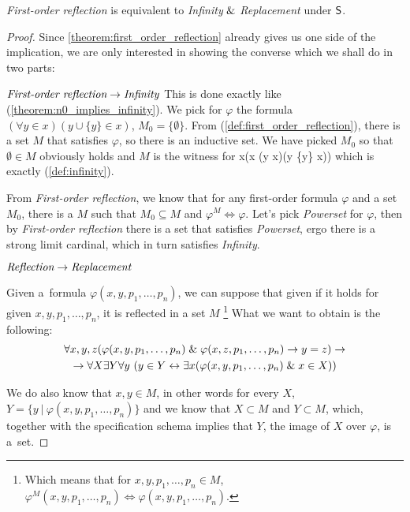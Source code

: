 \begin{theorem}\label{theorem:levy_equivalence_contemporary}
\emph{First-order reflection} is equivalent to \emph{Infinity} $ \mathrel{\&} $ \emph{Replacement} under $\sf{S}$.
\end{theorem}
\begin{proof}
Since \ref{theorem:first_order_reflection} already gives us one side of the implication, we are only interested in showing the converse which we shall do in two parts:

$\bold{\emph{First-order reflection} \rightarrow \emph{Infinity}}$
This is done exactly like (\ref{theorem:n0_implies_infinity}). We pick for $\varphi$ the formula $(\forall y \in x)(y \cup \{y\} \in x)$, $M_0 = \{\emptyset\}$. From (\ref{def:first_order_reflection}), there is a set $M$ that satisfies $\varphi$, so there is an inductive set. We have picked $M_0$ so that $\emptyset \in M$ obviously holds and $M$ is the witness for 
\beq
\exists x(\emptyset \in x \et (\forall y \in x)(y \cup \{y\} \in x))
\eeq
which is exactly (\ref{def:infinity}).

From \emph{First-order reflection}, we know that for any first-order formula $\varphi$ and a set $M_0$, there is a $M$ such that $M_0 \subseteq M$ and $\varphi^M \iff \varphi$. Let's pick \emph{Powerset} for $\varphi$, then by \emph{First-order reflection} there is a set that satisfies \emph{Powerset}, ergo there is a strong limit cardinal, which in turn satisfies \emph{Infinity}.
\

$\bold{\emph{Reflection} \rightarrow \emph{Replacement}}$

Given a~formula $\varphi(x, y, p_1, \ldots, p_n)$, we can suppose that given if it holds for given $x, y, p_1, \ldots, p_n$, it is reflected in a set $M$ \footnote{Which means that for $x, y, p_1, \ldots, p_n \in M$, $\varphi^M(x, y, p_1, \ldots, p_n) \iff \varphi(x, y, p_1, \ldots, p_n)$.}
What we want to obtain is the following:
\begin{equation}
\begin{gathered}
\forall x, y, z (\varphi(x, y, p_1, \ldots, p_n) \mathrel{\&} \varphi(x, z, p_1, \ldots, p_n) \rightarrow y = z) \rightarrow\\
\rightarrow \forall X \exists Y \forall y\ (y \in Y \leftrightarrow \exists x (\varphi(x, y, p_1, \ldots, p_n) \mathrel{\&} x \in X ))
\end{gathered}
\end{equation}

We do also know that $x, y \in M$, in other words for every $X$, $Y = \{y\ |\ \varphi(x, y, p_1, \ldots, p_n)\}$ and we know that $X \subset M$ and $Y \subset M$, which, together with the specification schema implies that $Y$, the image of $X$ over $\varphi$, is a~set.
\end{proof}

